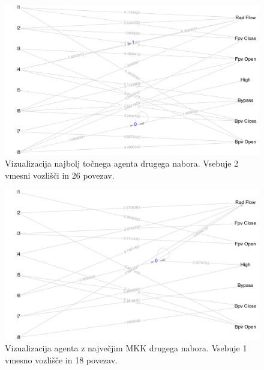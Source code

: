 \begin{figure}[H]
    \begin{center}
        \includegraphics[width=13cm]{shuttle/2/acc_g}
    \end{center}
    \caption{Vizualizacija najbolj točnega agenta drugega nabora. Vsebuje 2 vmesni vozlišči in 26 povezav.}
    \label{fig:statlog_acc_2_g}
\end{figure}

\begin{figure}[H]
    \begin{center}
        \includegraphics[width=13cm]{shuttle/2/mcc_g}
    \end{center}
    \caption{Vizualizacija agenta z največjim MKK drugega nabora. Vsebuje 1 vmesno vozlišče in 18 povezav.}
    \label{fig:statlog_mcc_2_g}
\end{figure}

\newpage

